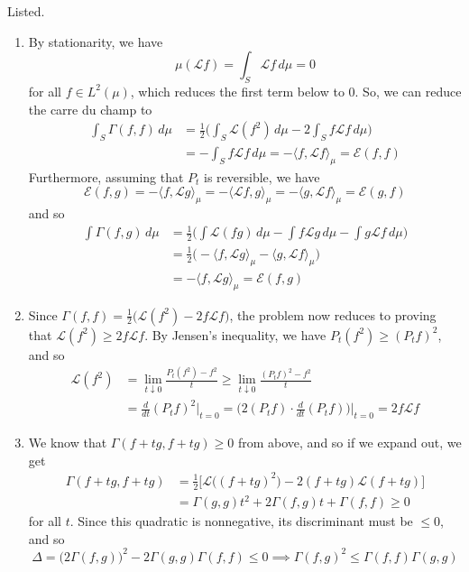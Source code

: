 \documentclass{article}
\theoremstyle{definition}
\theoremstyle{remark}
\theoremstyle{definition}
\begin{document}
  \begin{solution}
  Listed. 
  \begin{enumerate}
      \item By stationarity, we have 
      \[\mu ( \mathscr{L} f) = \int_S \mathscr{L} f \, d\mu = 0\]
      for all $f \in L^2 (\mu)$, which reduces the first term below to $0$. So, we can reduce the carre du champ to 
      \begin{align*}
          \int_S \Gamma(f, f) \, d\mu & = \frac{1}{2} \bigg( \int_S \mathscr{L} (f^2) \, d\mu - 2 \int_S f \mathscr{L} f \, d\mu \bigg) \\
          & = - \int_S f \mathscr{L} f \, d\mu = - \langle f, \mathscr{L} f \rangle_\mu = \mathcal{E}(f, f)
      \end{align*}
      Furthermore, assuming that $P_t$ is reversible, we have 
      \[\mathcal{E}(f, g) = - \langle f, \mathscr{L} g \rangle_\mu = -\langle \mathscr{L} f, g \rangle_\mu = - \langle g, \mathscr{L} f \rangle_\mu = \mathcal{E}(g, f)\]
      and so 
      \begin{align*}
          \int \Gamma (f, g) \, d\mu & = \frac{1}{2} \bigg( \int \mathscr{L}(f g) \, d\mu - \int f \mathscr{L} g \, d\mu - \int g \mathscr{L} f \, d\mu \bigg) \\
          & = \frac{1}{2} \big( - \langle f, \mathscr{L} g \rangle_\mu - \langle g, \mathscr{L} f\rangle_\mu \big) \\
          & = - \langle f, \mathscr{L} g \rangle_\mu = \mathcal{E}(f, g)
      \end{align*}
      
      \item Since $\Gamma(f, f) = \frac{1}{2} \big( \mathscr{L} (f^2) - 2 f \mathscr{L}f \big)$, the problem now reduces to proving that $\mathscr{L} (f^2) \geq 2 f \mathscr{L}f$. By Jensen's inequality, we have $P_t (f^2) \geq (P_t f)^2$, and so 
      \begin{align*}
          \mathscr{L}(f^2) & = \lim_{t \downarrow 0} \frac{P_t (f^2) - f^2}{t} \geq \lim_{t \downarrow 0} \frac{(P_t f)^2 - f^2}{t} \\
          & = \frac{d}{dt} (P_t f)^2 \bigg|_{t = 0} = \bigg( 2 (P_t f) \cdot \frac{d}{dt} (P_t f) \bigg)\bigg|_{t = 0} = 2 f \mathscr{L} f
      \end{align*}
      
      \item We know that $\Gamma(f + t g, f + tg) \geq 0$ from above, and so if we expand out, we get
      \begin{align*}
          \Gamma(f + t g, f + tg) & = \frac{1}{2} \Big[ \mathscr{L} \big( (f + t g)^2 \big) - 2 (f + t g) \mathscr{L}(f + t g) \Big] \\
          & = \Gamma(g, g) t^2 + 2 \Gamma (f, g) t + \Gamma(f, f) \geq 0 
      \end{align*}
      for all $t$. Since this quadratic is nonnegative, its discriminant must be $\leq 0$, and so 
      \[\Delta = \big( 2 \Gamma (f, g) \big)^2 - 2 \Gamma(g, g) \Gamma(f, f) \leq 0 \implies \Gamma(f, g)^2 \leq \Gamma(f, f) \Gamma(g, g)\]
      

\end{enumerate}
\end{solution}
\end{document}

